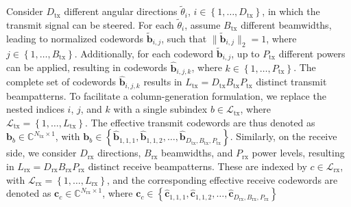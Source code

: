 \documentclass[10pt,journal,compsoc]{IEEEtran}
\theoremstyle{myremark}
\theoremstyle{myexample}
\begin{document}
Consider $ {D}_\mathrm{tx} $ different angular directions $ \widetilde{\theta}_i $, $ i \in \left\lbrace 1, \dots, {D}_\mathrm{tx} \right\rbrace $, in which the transmit signal can be steered. For each $ \widetilde{\theta}_i $, assume $ {B}_\mathrm{tx} $ different beamwidths, leading to normalized codewords $ \widetilde{\mathbf{b}}_{i,j} $, such that $ \big\| \widetilde{\mathbf{b}}_{i,j} \big\|_2 = 1 $, where $ j \in \left\lbrace 1, \dots, B_\mathrm{tx} \right\rbrace $. Additionally, for each codeword $ \widetilde{\mathbf{b}}_{i,j} $, up to $ {P}_\mathrm{tx} $ different powers can be applied, resulting in codewords $ \widehat{\mathbf{b}}_{i,j,k} $, where $ k \in \left\lbrace 1, \dots, P_\mathrm{tx} \right\rbrace $. The complete set of codewords $ \widehat{\mathbf{b}}_{i,j,k} $ results in $ L_\mathrm{tx} = D_\mathrm{tx} B_\mathrm{tx} P_\mathrm{tx} $ distinct transmit beampatterns. To facilitate a column-generation formulation, we replace the nested indices $ i $, $ j $, and $ k $ with a single subindex $ b \in \mathcal{L}_\mathrm{tx} $, where $ \mathcal{L}_\mathrm{tx} = \left\lbrace 1, \dots, L_\mathrm{tx} \right\rbrace $. The effective transmit codewords are thus denoted as $ \mathbf{b}_b \in \mathbb{C}^{N_\mathrm{tx} \times 1} $, with $ \mathbf{b}_b \in \left\lbrace \widehat{\mathbf{b}}_{1,1,1}, \widehat{\mathbf{b}}_{1,1,2}, \dots, \widehat{\mathbf{b}}_{D_\mathrm{tx},B_\mathrm{tx},P_\mathrm{tx}} \right\rbrace $. Similarly, on the receive side, we consider $ D_\mathrm{rx} $ directions, $ B_\mathrm{rx} $ beamwidths, and $ P_\mathrm{rx} $ power levels, resulting in $ L_\mathrm{rx} = D_\mathrm{rx} B_\mathrm{rx} P_\mathrm{rx} $ distinct receive beampatterns. These are indexed by $ c \in \mathcal{L}_\mathrm{rx} $, with $ \mathcal{L}_\mathrm{rx} = \left\lbrace 1, \dots, L_\mathrm{rx} \right\rbrace $, and the corresponding effective receive codewords are denoted as $ \mathbf{c}_c \in \mathbb{C}^{N_\mathrm{rx} \times 1} $, where $ \mathbf{c}_c \in \left\lbrace \widehat{\mathbf{c}}_{1,1,1}, \widehat{\mathbf{c}}_{1,1,2}, \dots, \widehat{\mathbf{c}}_{D_\mathrm{rx},B_\mathrm{rx},P_\mathrm{rx}} \right\rbrace $
\end{document}
